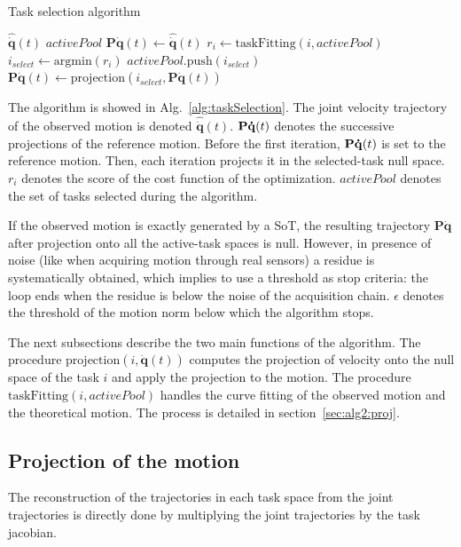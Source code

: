 \documentclass[journal]{IEEEtran}
\begin{document}
\begin{algorithm}[t]
  \caption{Task selection algorithm}
  \label{alg:taskSelection}
\begin{algorithmic}[1]
  \STATE \shINPUT $\mathbf{\hat{\dot{q}}}(t)$
\STATE \shOUTPUT $activePool$
\STATE $\mathbf{P}\mathbf{\dot{q}}(t)\gets \mathbf{\hat{\dot{q}}}(t)$
    \STATE $r_i \gets \mathrm{taskFitting}(i, activePool)$
  \ENDFOR
  \STATE $i_{select} \gets \mathrm{argmin}(r_i)$
  \STATE $activePool.\mathrm{push}(i_{select})$
  \STATE $\mathbf{P}\mathbf{\dot{q}}(t) \gets \mathrm{projection}(i_{select}, \mathbf{P}\mathbf{\dot{q}}(t))$
\ENDWHILE
\end{algorithmic}
\end{algorithm}
The algorithm is showed in Alg.~\ref{alg:taskSelection}.
The joint velocity trajectory
of the observed motion is denoted $\mathbf{\hat{\dot{q}}}(t)$.
${\mathbf{P\dot{q}}}(t)$ denotes the successive projections of the reference
motion. Before the first iteration, ${\mathbf{P\dot{q}}}(t)$ is set to the reference motion.
Then, each iteration projects it in the selected-task null space.
$r_i$ denotes the score of the cost function of the optimization. $activePool$ denotes
the set of tasks selected during the algorithm. 

If the observed motion is exactly generated by a SoT, 
the resulting trajectory $\mathbf{P\dot{q}}$ after projection
onto all the active-task spaces is null. However, in presence of noise (like when
acquiring motion through real sensors)
a residue is systematically obtained, which implies to use a threshold
as stop criteria: the loop ends when the residue is below the noise of
the acquisition chain. $\epsilon$ denotes the threshold
of the motion norm below which the algorithm stops.

The next subsections describe the two main functions of the algorithm.
The procedure $\mathrm{projection}(i, \mathbf{\dot{q}}(t))$ computes the projection of
velocity onto the null space of the task $i$ and apply the projection to the motion.
The procedure $\mathrm{taskFitting}(i, activePool)$ handles the curve fitting
of the observed motion and the theoretical motion. The process is detailed in section~\ref{sec:alg2:proj}.


\subsection{Projection of the motion}
The reconstruction of the trajectories in each task space from the joint trajectories is directly
done by multiplying the joint trajectories by the task jacobian.
\end{document}
